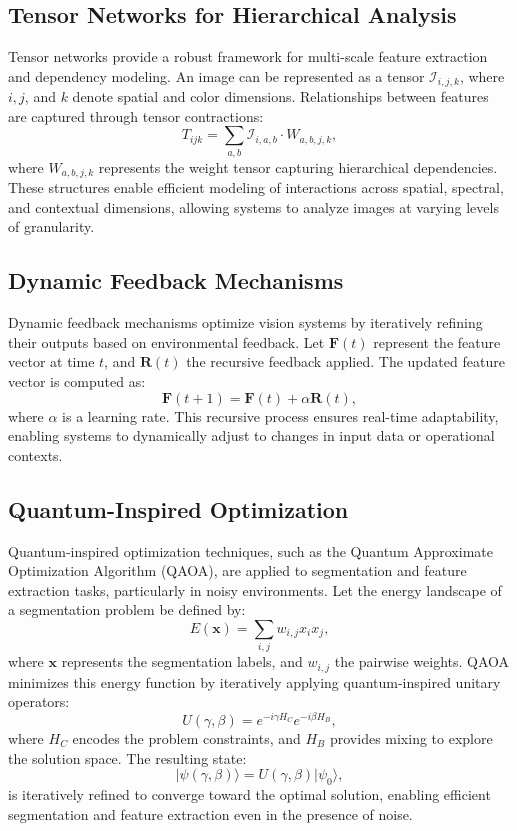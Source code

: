 \documentclass{article}
\theoremstyle{plain}
\begin{document}
\subsection{Tensor Networks for Hierarchical Analysis}
Tensor networks provide a robust framework for multi-scale feature extraction and dependency modeling. An image can be represented as a tensor \( \mathcal{I}_{i,j,k} \), where \( i, j \), and \( k \) denote spatial and color dimensions. Relationships between features are captured through tensor contractions:
\begin{equation}
T_{ijk} = \sum_{a,b} \mathcal{I}_{i,a,b} \cdot W_{a,b,j,k},
\end{equation}
where \( W_{a,b,j,k} \) represents the weight tensor capturing hierarchical dependencies. These structures enable efficient modeling of interactions across spatial, spectral, and contextual dimensions, allowing systems to analyze images at varying levels of granularity.

\subsection{Dynamic Feedback Mechanisms}
Dynamic feedback mechanisms optimize vision systems by iteratively refining their outputs based on environmental feedback. Let \( \mathbf{F}(t) \) represent the feature vector at time \( t \), and \( \mathbf{R}(t) \) the recursive feedback applied. The updated feature vector is computed as:
\begin{equation}
\mathbf{F}(t+1) = \mathbf{F}(t) + \alpha \mathbf{R}(t),
\end{equation}
where \( \alpha \) is a learning rate. This recursive process ensures real-time adaptability, enabling systems to dynamically adjust to changes in input data or operational contexts.

\subsection{Quantum-Inspired Optimization}
Quantum-inspired optimization techniques, such as the Quantum Approximate Optimization Algorithm (QAOA), are applied to segmentation and feature extraction tasks, particularly in noisy environments. Let the energy landscape of a segmentation problem be defined by:
\begin{equation}
E(\mathbf{x}) = \sum_{i,j} w_{i,j} x_i x_j,
\end{equation}
where \( \mathbf{x} \) represents the segmentation labels, and \( w_{i,j} \) the pairwise weights. QAOA minimizes this energy function by iteratively applying quantum-inspired unitary operators:
\begin{equation}
U(\gamma, \beta) = e^{-i \gamma H_C} e^{-i \beta H_B},
\end{equation}
where \( H_C \) encodes the problem constraints, and \( H_B \) provides mixing to explore the solution space. The resulting state:
\begin{equation}
|\psi(\gamma, \beta)\rangle = U(\gamma, \beta) |\psi_0\rangle,
\end{equation}
is iteratively refined to converge toward the optimal solution, enabling efficient segmentation and feature extraction even in the presence of noise.
\end{document}
